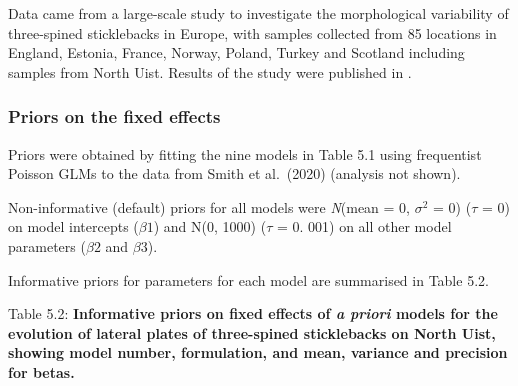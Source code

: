 \documentclass[
]{book}
\begin{document}
Data came from a large-scale study to investigate the morphological variability of three-spined sticklebacks in Europe, with samples collected from 85 locations in England, Estonia, France, Norway, Poland, Turkey and Scotland including samples from North Uist. Results of the study were published in \citet{Smith_2020}.

\hypertarget{pois-priors-fixed}{%
\subsubsection{Priors on the fixed effects}\label{pois-priors-fixed}}

Priors were obtained by fitting the nine models in Table 5.1 using frequentist Poisson GLMs to the data from Smith et al.~(2020) (analysis not shown).

Non-informative (default) priors for all models were \emph{N}(mean = 0, \(\sigma^2\) = 0) (\(\tau\) = 0) on model intercepts (\(\beta1\)) and N(0, 1000) (\(\tau\) = 0. 001) on all other model parameters (\(\beta2\) and \(\beta3\)).

Informative priors for parameters for each model are summarised in Table 5.2.

Table 5.2: \textbf{Informative priors on fixed effects of \emph{a priori} models for the evolution of lateral plates of three-spined sticklebacks on North Uist, showing model number, formulation, and mean, variance and precision for betas.}
\end{document}
